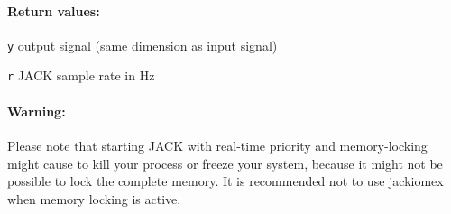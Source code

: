 \paragraph{Return values:}
\begin{description}
\item{\tt y} output signal (same dimension as input signal)
\item{\tt r} JACK sample rate in Hz
\end{description}

\paragraph{Warning:}

Please note that starting JACK with real-time priority and
memory-locking might cause to kill your \Matlab{} process or freeze your
system, because it might not be possible to lock the complete \Matlab{}
memory. It is recommended not to use jackiomex when memory locking is
active.



